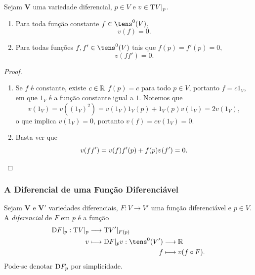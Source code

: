 \begin{prop}
\label{topo:prop.deriva.lema}
Sejam $\bm V$ uma variedade diferencial, $p \in V$ e $v \in \mathrm{T} V|_p$.
	\begin{enumerate}
	\item Para toda função constante $f \in \tens^0(V)$,
		\begin{equation*}
		v(f) = 0.
		\end{equation*}
	\item Para todas funções $f,f' \in \tens^0(V)$ tais que $f(p)=f'(p)=0$,
		\begin{equation*}
		v(ff')=0.
		\end{equation*}
	\end{enumerate}
\end{prop}
\begin{proof}
	\begin{enumerate}
	\item Se $f$ é constante, existe $c \in \mathbb{R}$ $f(p)=c$ para todo $p \in V$, portanto $f=c1_V$, em que $1_V$ é a função constante igual a $1$. Notemos que
		\begin{equation*}
		v(1_V) = v((1_V)^2) = v(1_V)1_V(p) + 1_V(p)v(1_V) = 2v(1_V),
		\end{equation*}
o que implica $v(1_V)=0$, portanto $v(f) = cv(1_V) = 0$.
	\item Basta ver que
		\begin{equation*}
		v(ff') = v(f)f'(p) + f(p)v(f') = 0. \qedhere
		\end{equation*}
	\end{enumerate}
\end{proof}

\subsubsection{A Diferencial de uma Função Diferenciável}

\begin{defi}
Sejam $\bm V$ e $\bm V'$ variedades diferenciais, $F\colon V \to V'$ uma função diferenciável e $p \in V$. A \emph{diferencial} de $F$ em $p$ é a função
	\begin{align*}
	\func{\D F|_p}{\Tg V|_p}{\Tg V'|_{F(p)}}{v}{
		\begin{aligned}[t]
		\func{\D F|_p v}{\tens^0(V')}{\R}{f}{v(f \circ F).}
		\end{aligned}
		}
	\end{align*}
Pode-se denotar $\mathrm{D} F_p$ por simplicidade.
\end{defi}

